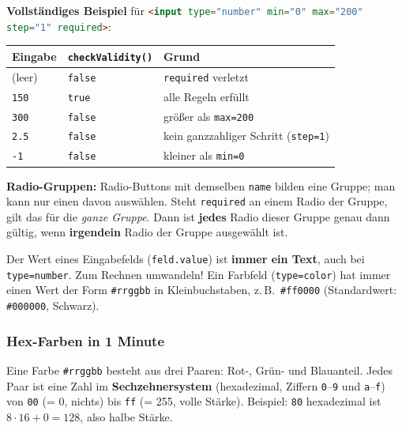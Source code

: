 \documentclass[a4paper,11pt]{article}
\begin{document}
\textbf{Vollständiges Beispiel} für \lstinline[language=HTML]|<input type="number" min="0" max="200" step="1" required>|:
\begin{center}
\begin{tabular}{@{}lll@{}}
\toprule
Eingabe & \texttt{checkValidity()} & Grund\\
\midrule
(leer)  & \lstinline|false| & \texttt{required} verletzt\\
\texttt{150} & \lstinline|true|  & alle Regeln erfüllt\\
\texttt{300} & \lstinline|false| & größer als \texttt{max=200}\\
\texttt{2.5} & \lstinline|false| & kein ganzzahliger Schritt (\texttt{step=1})\\
\texttt{-1}  & \lstinline|false| & kleiner als \texttt{min=0}\\
\bottomrule
\end{tabular}
\end{center}

\textbf{Radio-Gruppen:} Radio-Buttons mit demselben \texttt{name} bilden eine Gruppe; man kann nur einen davon
auswählen. Steht \texttt{required} an einem Radio der Gruppe, gilt das für die \emph{ganze Gruppe}. Dann ist
\textbf{jedes} Radio dieser Gruppe genau dann gültig, wenn \textbf{irgendein} Radio der Gruppe ausgewählt ist.

\begin{merkbox}
Der Wert eines Eingabefelds (\lstinline|feld.value|) ist \textbf{immer ein Text}, auch bei \texttt{type=\textquotedbl{}number\textquotedbl{}}.
Zum Rechnen umwandeln! Ein Farbfeld (\texttt{type=\textquotedbl{}color\textquotedbl{}}) hat immer einen Wert der Form \texttt{\textquotedbl{}\#rrggbb\textquotedbl{}}
in Kleinbuchstaben, z.\,B.\ \texttt{\textquotedbl{}\#ff0000\textquotedbl{}} (Standardwert: \texttt{\textquotedbl{}\#000000\textquotedbl{}}, Schwarz).
\end{merkbox}

\subsubsection*{Hex-Farben in 1 Minute}

Eine Farbe \texttt{\#rrggbb} besteht aus drei Paaren: Rot-, Grün- und Blauanteil. Jedes Paar ist eine Zahl im
\textbf{Sechzehnersystem} (hexadezimal, Ziffern \texttt{0}--\texttt{9} und \texttt{a}--\texttt{f}) von
\texttt{00} (= 0, nichts) bis \texttt{ff} (= 255, volle Stärke). Beispiel: \texttt{80} hexadezimal ist
$8 \cdot 16 + 0 = 128$, also halbe Stärke.
\end{document}
